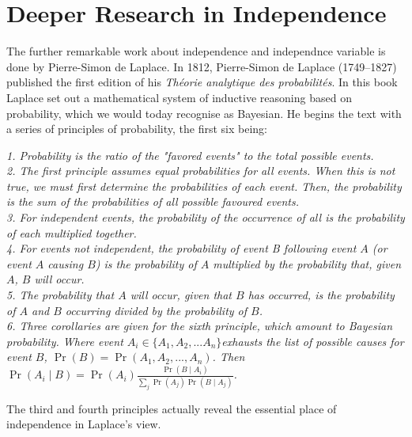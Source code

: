 \documentclass{article}
\begin{document}
\section{Deeper Research in Independence}
The further remarkable work about independence and independnce variable is done by Pierre-Simon de Laplace. In 1812, Pierre-Simon de Laplace (1749–1827) published the ﬁrst edition of his \textit{Théorie analytique des probabilités}\cite{laplace1820theorie}. In this book Laplace set out a mathematical system of inductive reasoning based on probability, which we would today recognise as Bayesian. He begins the text with a series of principles of probability, the first six being:
\begin{tcolorbox}[colback=black!0!white,colframe=red!75!black]
\slshape
1. Probability is the ratio of the "favored events" to the total possible events.\\
2. The first principle assumes equal probabilities for all events. When this is not true, we must first determine the probabilities of each event. Then, the probability is the sum of the probabilities of all possible favoured events.\\
3. For independent events, the probability of the occurrence of all is the probability of each multiplied together.\\
4. For events not independent, the probability of event B following event $A$ (or event $A$ causing $B$) is the probability of $A$ multiplied by the probability that, given $A$, $B$ will occur.\\
5. The probability that $A$ will occur, given that $B$ has occurred, is the probability of $A$ and $B$ occurring divided by the probability of $B$.\\
6. Three corollaries are given for the sixth principle, which amount to Bayesian probability. Where event $A_i \in \{A_1, A_2, ... A_n\} $exhausts the list of possible causes for event $B$, $\Pr(B) = \Pr(A_1, A_2, ..., A_n)$. Then
$\Pr(A_{i}\mid B)=\Pr(A_{i}){\frac {\Pr(B\mid A_{i})}{\sum _{j}\Pr(A_{j})\Pr(B\mid A_{j})}}$.
\end{tcolorbox}

The third and fourth principles actually reveal the essential place of independence in Laplace's view.
\end{document}
